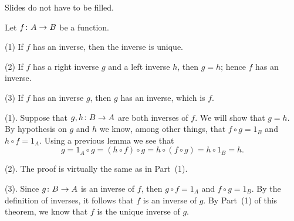 \documentclass[12pt, oneside, reqno]{article}
\begin{document}
Slides do not have to be filled.



\thm\label{thmAA} 
Let ${f} \colon {A} \to {B}$ be a function.
%
\enum 
\item[(1)] If $f$ has an inverse, then the inverse is unique.
%
\item[(2)] If $f$ has a right inverse $g$ and a left inverse $h$, then $g = h$; hence $f$ has an inverse.
%
\item[(3)] If $f$ has an inverse $g$, then $g$ has an inverse, which is $f$.
\eenum
\ethm
 
\demo
(1). Suppose that ${g, h} \colon {B} \to {A}$ are both inverses of $f$.  We will show that $g = h$.  By hypothesis on $g$ and $h$ we know, among other things, that $f \circ g = 1_B$ and $h \circ f = 1_A$.  Using a previous lemma we see that
%
\[
g  =  1_A \circ g  =  (h \circ f) \circ g  =  h \circ (f \circ g)  =  h \circ 1_B  =  h.
\]

\noindent (2). The proof is virtually the same as in Part~(1).  
\spce

\noindent (3).  Since ${g} \colon {B} \to {A}$ is an inverse of $f$, then $g \circ f = 1_A$ and $f \circ g = 1_B$.  By the definition of inverses, it follows that $f$ is an inverse of $g$.  By Part~(1) of this theorem, we know that $f$ is the unique inverse of $g$.
\edemo

\begin{bibliog}




\end{bibliog}
\end{document}
